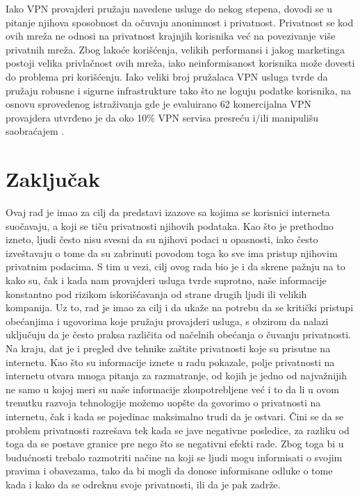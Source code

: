 \documentclass[a4paper]{article}
\begin{document}
\par Iako VPN provajderi pružaju navedene usluge do nekog stepena, dovodi se u pitanje njihova sposobnost da očuvaju anonimnost i privatnost. Privatnost se kod ovih mreža ne odnosi na privatnost krajnjih korisnika već na povezivanje više privatnih mreža. Zbog lakoće korišćenja, velikih performansi i jakog marketinga postoji velika privlačnost ovih mreža, iako neinformisanost korisnika može dovesti do problema pri korišćenju. Iako veliki broj pružalaca VPN usluga  tvrde da pružaju robusne i sigurne infrastrukture tako što ne loguju podatke korisnika, na osnovu sprovedenog istraživanja gde je evaluirano 62 komercijalna VPN provajdera utvrđeno je da oko 10\% VPN servisa presreću i/ili manipulišu saobraćajem \cite{vpn6}.

 
\section{Zaključak}
\label{sec:zakljucak}
Ovaj rad je imao za cilj da predstavi izazove sa kojima se korisnici interneta suočavaju, a koji se tiču privatnosti njihovih podataka. Kao što je prethodno izneto, ljudi često nisu svesni da su njihovi podaci u opasnosti, iako često izveštavaju o tome da su zabrinuti povodom toga ko sve ima pristup njihovim privatnim podacima. S tim u vezi, cilj ovog rada bio je i da skrene pažnju na to kako su, čak i kada nam provajderi usluga tvrde suprotno, naše informacije konstantno pod rizikom iskorišćavanja od strane drugih ljudi ili velikih kompanija. Uz to, rad je imao za cilj i da ukaže na potrebu da se kritički pristupi obećanjima i ugovorima koje pružaju provajderi usluga, s obzirom da nalazi uključuju da je često praksa različita od načelnih obećanja o čuvanju privatnosti. Na kraju, dat je i pregled dve tehnike zaštite privatnosti koje su prisutne na internetu. Kao što su informacije iznete u radu pokazale, polje privatnosti na internetu otvara mnoga pitanja za razmatranje, od kojih je jedno od najvažnijih ne samo u kojoj meri su naše informacije zloupotrebljene već i to da li u ovom trenutku razvoja tehnologije možemo uopšte da govorimo o privatnosti na internetu, čak i kada se pojedinac maksimalno trudi da je ostvari. Čini se da se problem privatnosti razrešava tek kada se jave negativne posledice, za razliku od toga da se postave granice pre nego što se negativni efekti rade. Zbog toga bi u budućnosti trebalo razmotriti načine na koji se ljudi mogu informisati o svojim pravima i obavezama, tako da bi mogli da donose informisane odluke o tome kada i kako da se odreknu svoje privatnosti, ili da je pak zadrže.

 

\end{document}
